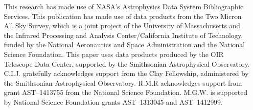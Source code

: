 \documentclass[12pt,preprint]{emulateapj}
\begin{document}
\acknowledgements

This research has made use of NASA's Astrophysics Data System Bibliographic
Services.  This publication has made use of data products from the Two Micron
All Sky Survey, which is a joint project of the University of Massachusetts
and the Infrared Processing and Analysis Center/California Institute of
Technology, funded by the National Aeronautics and Space Administration and
the National Science Foundation.  This paper uses data products produced by the
OIR Telescope Data Center, supported by the Smithsonian Astrophysical 
Observatory.  C.I.J. gratefully acknowledges support from the Clay Fellowship, 
administered by the Smithsonian Astrophysical Observatory.  R.M.R acknowledges 
support from grant AST--1413755 from the National Science Foundation.  M.G.W. 
is supported by National Science Foundation grants AST--1313045 and 
AST--1412999.
\end{document}
